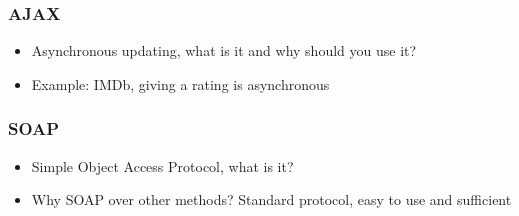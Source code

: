 \begin{frame}
\frametitle{AJAX}
\begin{itemize}
\item Asynchronous updating, what is it and why should you use it?
\item Example: IMDb, giving a rating is asynchronous
\end{itemize}
\end{frame}

\begin{frame}
\frametitle{SOAP}
\begin{itemize}
\item Simple Object Access Protocol, what is it?
\item Why SOAP over other methods? Standard protocol, easy to use and sufficient
\end{itemize}
\end{frame}